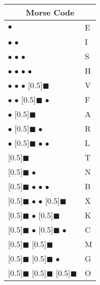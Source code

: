 \documentclass[11pt]{article}
\newcommand{\MorseDot}{$\bullet$ }
\newcommand{\MorseDash}{\scalebox{1.5}[0.5]{$\blacksquare$} }
\begin{document}
\begin{multicols}{3}

\begin{tabular}{|ll|}
\hline
\multicolumn{2}{|c|}{Morse Code} \\
\hline
\MorseDot & E \\
\MorseDot\MorseDot & I \\
\MorseDot\MorseDot\MorseDot & S \\
\MorseDot\MorseDot\MorseDot\MorseDot & H \\
\MorseDot\MorseDot\MorseDot\MorseDash & V \\
\MorseDot\MorseDot\MorseDash\MorseDot & F \\
\MorseDot\MorseDash & A \\
\MorseDot\MorseDash\MorseDot & R \\
\MorseDot\MorseDash\MorseDot\MorseDot & L \\
\MorseDash & T \\
\MorseDash\MorseDot & N \\
\MorseDash\MorseDot\MorseDot\MorseDot & B \\
\MorseDash\MorseDot\MorseDot\MorseDash & X \\
\MorseDash\MorseDot\MorseDash & K \\
\MorseDash\MorseDot\MorseDash\MorseDot & C \\
\MorseDash\MorseDash & M \\
\MorseDash\MorseDash\MorseDot & G \\
\MorseDash\MorseDash\MorseDash & O \\
\hline
\end{tabular}


\end{multicols}
\end{document}
